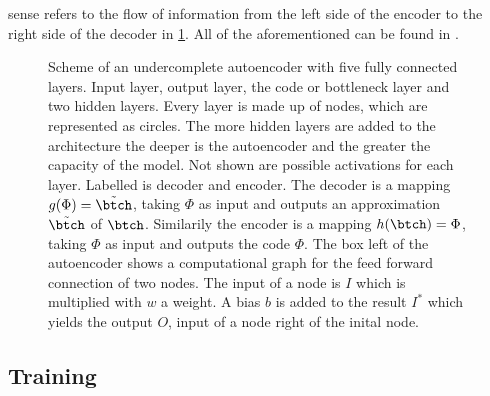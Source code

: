 sense refers to the flow of information from the left side of the encoder to the right side of the decoder in \cref{Fig:Autoencoder}. All of the aforementioned can be found in \cite{Goodfellow}.\\
\begin{figure}
	\centering
	
	\caption{\footnotesize Scheme of an undercomplete autoencoder with five fully connected layers. Input layer, output layer, the code or bottleneck layer and two hidden layers. Every layer is made up of nodes, which are represented as circles. The more hidden layers are added to the architecture the deeper is the autoencoder and the greater the capacity of the model. Not shown are possible activations for each layer. Labelled is decoder and encoder. The decoder is a mapping \(g(\Phi)=\tilde{\btch}\), taking \(\Phi\) as input and outputs an approximation \(\tilde{\btch}\) of \(\btch\). Similarily the encoder is a mapping \(h(\btch)=\Phi\), taking \(\Phi\) as input and outputs the code \(\Phi\). The box left of the autoencoder shows a computational graph for the feed forward connection of two nodes. The input of a node is \(I\) which is multiplied with \(w\) a weight. A bias \(b\) is added to the result \(I^*\) which yields the output \(O\), input of a node right of the inital node.}
	\label{Fig:Autoencoder}
\end{figure}
\subsection{Training}

